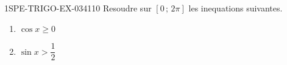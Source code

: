 \begin{exercice}{1SPE-TRIGO-EX-034}{1}{10}
Resoudre sur $[0\,;\,2\pi]$ les inequations suivantes.
\begin{enumerate}
  \item $\cos x \geqslant 0$
  \item $\sin x > \dfrac{1}{2}$
\end{enumerate}
\end{exercice}
